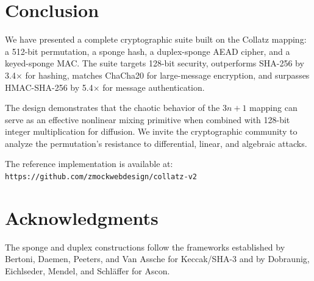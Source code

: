 \documentclass[11pt,a4paper]{article}
\begin{document}
\section{Conclusion}
\label{sec:conclusion}

We have presented a complete cryptographic suite built on the Collatz
mapping: a 512-bit permutation, a sponge hash, a duplex-sponge AEAD
cipher, and a keyed-sponge MAC. The suite targets 128-bit security,
outperforms SHA-256 by 3.4$\times$ for hashing, matches ChaCha20 for
large-message encryption, and surpasses HMAC-SHA-256 by 5.4$\times$ for
message authentication.

The design demonstrates that the chaotic behavior of the $3n+1$ mapping
can serve as an effective nonlinear mixing primitive when combined with
128-bit integer multiplication for diffusion. We invite the cryptographic
community to analyze the permutation's resistance to differential,
linear, and algebraic attacks.

The reference implementation is available at:
\texttt{https://github.com/zmockwebdesign/collatz-v2}

\section*{Acknowledgments}

The sponge and duplex constructions follow the frameworks established by
Bertoni, Daemen, Peeters, and Van Assche for Keccak/SHA-3 and by
Dobraunig, Eichlseder, Mendel, and Schl\"affer for Ascon.
\end{document}

